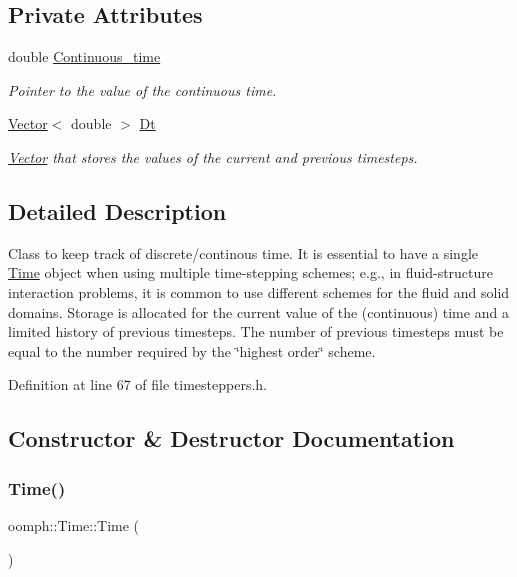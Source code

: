\subsection*{Private Attributes}
\begin{DoxyCompactItemize}
\item 
double \hyperlink{classoomph_1_1Time_a0d304d449babd0531b76668c6548ad4b}{Continuous\+\_\+time}
\begin{DoxyCompactList}\small\item\em Pointer to the value of the continuous time. \end{DoxyCompactList}\item 
\hyperlink{classoomph_1_1Vector}{Vector}$<$ double $>$ \hyperlink{classoomph_1_1Time_a3fbca07ec14a12aaffc2fbfc8503def2}{Dt}
\begin{DoxyCompactList}\small\item\em \hyperlink{classoomph_1_1Vector}{Vector} that stores the values of the current and previous timesteps. \end{DoxyCompactList}\end{DoxyCompactItemize}


\subsection{Detailed Description}
Class to keep track of discrete/continous time. It is essential to have a single \hyperlink{classoomph_1_1Time}{Time} object when using multiple time-\/stepping schemes; e.\+g., in fluid-\/structure interaction problems, it is common to use different schemes for the fluid and solid domains. Storage is allocated for the current value of the (continuous) time and a limited history of previous timesteps. The number of previous timesteps must be equal to the number required by the \char`\"{}highest order\char`\"{} scheme. 

Definition at line 67 of file timesteppers.\+h.



\subsection{Constructor \& Destructor Documentation}
\mbox{\label{classoomph_1_1Time_aed3c6b92973210d2347fc5be372e41a8}} 
\subsubsection{\texorpdfstring{Time()}{Time()}\hspace{0.1cm}{\footnotesize\ttfamily [1/3]}}
{\footnotesize\ttfamily oomph\+::\+Time\+::\+Time (\begin{DoxyParamCaption}{ }\end{DoxyParamCaption})\hspace{0.3cm}{\ttfamily [inline]}}



